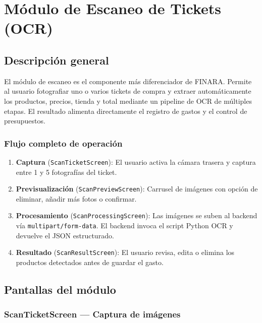 \documentclass[12pt, letterpaper]{article}
\newcommand{\campo}[1]{\texttt{#1}}
\begin{document}
\section{Módulo de Escaneo de Tickets (OCR)}

\subsection{Descripción general}

El módulo de escaneo es el componente más diferenciador de FINARA. Permite
al usuario fotografiar uno o varios tickets de compra y extraer automáticamente
los productos, precios, tienda y total mediante un pipeline de OCR de múltiples
etapas. El resultado alimenta directamente el registro de gastos y el control
de presupuestos.

\subsubsection{Flujo completo de operación}

\begin{enumerate}
  \item \textbf{Captura} (\campo{ScanTicketScreen}): El usuario activa la
    cámara trasera y captura entre 1 y 5 fotografías del ticket.
  \item \textbf{Previsualización} (\campo{ScanPreviewScreen}): Carrusel de
    imágenes con opción de eliminar, añadir más fotos o confirmar.
  \item \textbf{Procesamiento} (\campo{ScanProcessingScreen}): Las imágenes
    se suben al backend vía \campo{multipart/form-data}. El backend invoca el
    script Python OCR y devuelve el JSON estructurado.
  \item \textbf{Resultado} (\campo{ScanResultScreen}): El usuario revisa,
    edita o elimina los productos detectados antes de guardar el gasto.
\end{enumerate}

\subsection{Pantallas del módulo}

\subsubsection{ScanTicketScreen — Captura de imágenes}
\end{document}

